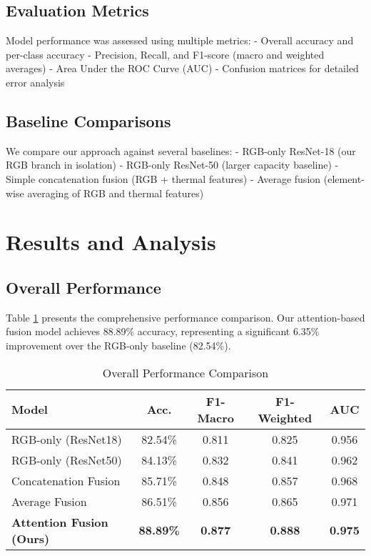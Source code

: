 \documentclass[conference]{IEEEtran}
\begin{document}
\subsection{Evaluation Metrics}

Model performance was assessed using multiple metrics:
- Overall accuracy and per-class accuracy
- Precision, Recall, and F1-score (macro and weighted averages)
- Area Under the ROC Curve (AUC)
- Confusion matrices for detailed error analysis

\subsection{Baseline Comparisons}

We compare our approach against several baselines:
- RGB-only ResNet-18 (our RGB branch in isolation)
- RGB-only ResNet-50 (larger capacity baseline)
- Simple concatenation fusion (RGB + thermal features)
- Average fusion (element-wise averaging of RGB and thermal features)

\section{Results and Analysis}

\subsection{Overall Performance}

Table \ref{tab:main_results} presents the comprehensive performance comparison. Our attention-based fusion model achieves 88.89\% accuracy, representing a significant 6.35\% improvement over the RGB-only baseline (82.54\%).

\begin{table}[htbp]
\caption{Overall Performance Comparison}
\begin{center}
\begin{tabular}{|l|c|c|c|c|}
\hline
\textbf{Model} & \textbf{Acc.} & \textbf{F1-Macro} & \textbf{F1-Weighted} & \textbf{AUC} \\
\hline
RGB-only (ResNet18) & 82.54\% & 0.811 & 0.825 & 0.956 \\
RGB-only (ResNet50) & 84.13\% & 0.832 & 0.841 & 0.962 \\
Concatenation Fusion & 85.71\% & 0.848 & 0.857 & 0.968 \\
Average Fusion & 86.51\% & 0.856 & 0.865 & 0.971 \\
\textbf{Attention Fusion (Ours)} & \textbf{88.89\%} & \textbf{0.877} & \textbf{0.888} & \textbf{0.975} \\
\hline
\end{tabular}
\label{tab:main_results}
\end{center}
\end{table}
\end{document}
